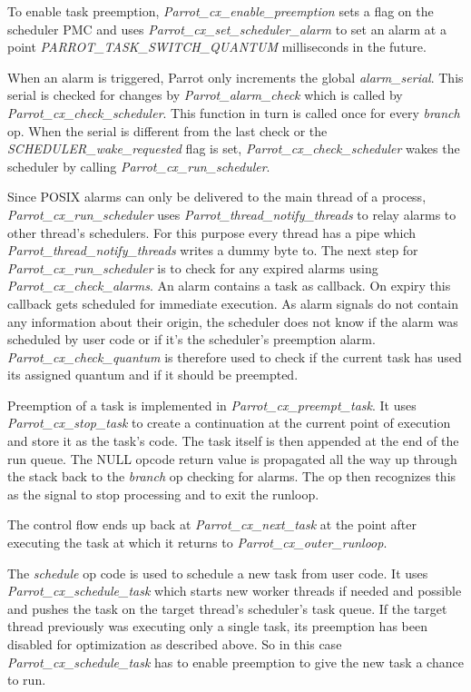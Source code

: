 \documentclass[bachelor,english]{hgbthesis}
\begin{document}
To enable task preemption, \textit{Parrot\_cx\_enable\_preemption} sets a flag on the scheduler PMC and uses \textit{Parrot\_cx\_set\_scheduler\_alarm} to set an alarm at a point \textit{PARROT\_TASK\_SWITCH\_QUANTUM} milliseconds in the future.

When an alarm is triggered, Parrot only increments the global \textit{alarm\_serial}. This serial is checked for changes by \textit{Parrot\_alarm\_check} which is called by \textit{Parrot\_cx\_check\_scheduler}. This function in turn is called once for every \textit{branch} op. When the serial is different from the last check or the \textit{SCHEDULER\_wake\_requested} flag is set, \textit{Parrot\_cx\_check\_scheduler} wakes the scheduler by calling \textit{Parrot\_cx\_run\_scheduler}.

Since POSIX alarms can only be delivered to the main thread of a process, \textit{Parrot\_cx\_run\_scheduler} uses \textit{Parrot\_thread\_notify\_threads} to relay alarms to other thread's schedulers. For this purpose every thread has a pipe which \textit{Parrot\_thread\_notify\_threads} writes a dummy byte to. The next step for \textit{Parrot\_cx\_run\_scheduler} is to check for any expired alarms using \textit{Parrot\_cx\_check\_alarms}. An alarm contains a task as callback. On expiry this callback gets scheduled for immediate execution. As alarm signals do not contain any information about their origin, the scheduler does not know if the alarm was scheduled by user code or if it's the scheduler's preemption alarm. \textit{Parrot\_cx\_check\_quantum} is therefore used to check if the current task has used its assigned quantum and if it should be preempted.

Preemption of a task is implemented in \textit{Parrot\_cx\_preempt\_task}. It uses \textit{Parrot\_cx\_stop\_task} to create a continuation at the current point of execution and store it as the task's code. The task itself is then appended at the end of the run queue. The NULL opcode return value is propagated all the way up through the stack back to the \textit{branch} op checking for alarms. The op then recognizes this as the signal to stop processing and to exit the runloop.

The control flow ends up back at \textit{Parrot\_cx\_next\_task} at the point after executing the task at which it returns to \textit{Parrot\_cx\_outer\_runloop}.

The \textit{schedule} op code is used to schedule a new task from user code. It uses \textit{Parrot\_cx\_schedule\_task} which starts new worker threads if needed and possible and pushes the task on the target thread's scheduler's task queue. If the target thread previously was executing only a single task, its preemption has been disabled for optimization as described above. So in this case \textit{Parrot\_cx\_schedule\_task} has to enable preemption to give the new task a chance to run.
\end{document}
